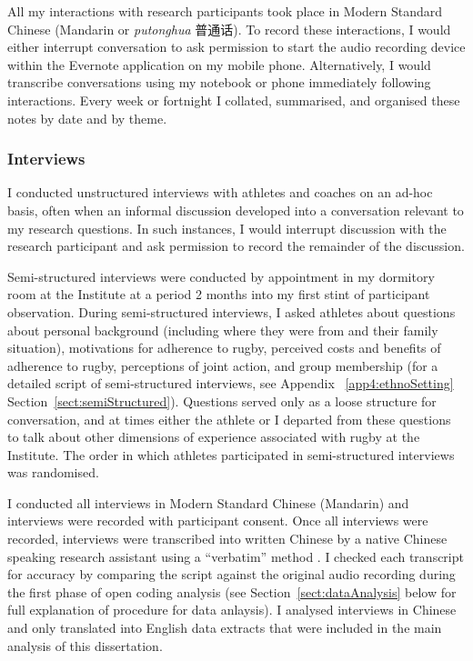 \begin{CJK}{UTF8}{gbsn}
All my interactions with research participants took place in Modern Standard Chinese (Mandarin or \textit{putonghua} 普通话).  To record these interactions, I would either interrupt conversation to ask permission to start the audio recording device within the Evernote application on my mobile phone.  Alternatively, I would transcribe conversations using my notebook or phone immediately following interactions.  Every week or fortnight I collated, summarised, and organised these notes by date and by theme.


  \subsubsection{Interviews}
I conducted unstructured interviews with athletes and coaches on an ad-hoc basis, often when an informal discussion developed into a conversation relevant to my research questions.  In such instances, I would interrupt discussion with the research participant and ask permission to record the remainder of the discussion.

Semi-structured interviews were conducted by appointment in my dormitory room at the Institute at a period 2 months into my first stint of participant observation.  During semi-structured interviews, I asked athletes about questions about personal background (including where they were from and their family situation), motivations for adherence to rugby, perceived costs and benefits of adherence to rugby, perceptions of joint action, and group membership (for a detailed script of semi-structured interviews, see Appendix ~\ref{app4:ethnoSetting} Section~\ref{sect:semiStructured}).  Questions served only as a loose structure for conversation, and at times either the athlete or I departed from these questions to talk about other dimensions of experience associated with rugby at the Institute.  The order in which athletes participated in semi-structured interviews was randomised.

I conducted all interviews in Modern Standard Chinese (Mandarin) and interviews were recorded with participant consent.  Once all interviews were recorded, interviews were transcribed into written Chinese by a native Chinese speaking research assistant using a ``verbatim'' method \citep[i.e., including an account of all verbal and important nonverbal (coughs, pauses, etc.) utterances, see][269-70]{Poland2003}.  I checked each transcript for accuracy by comparing the script against the original audio recording during the first phase of open coding analysis (see Section~\ref{sect:dataAnalysis} below for full explanation of procedure for data anlaysis).  I analysed interviews in Chinese and only translated into English data extracts that were included in the main analysis of this dissertation.


\end{CJK}
